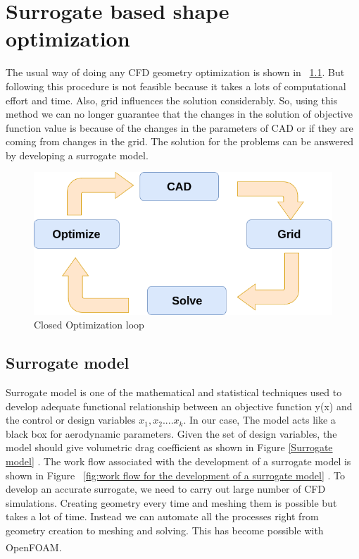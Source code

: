 \chapter{Surrogate based shape optimization}
\label{optimization}
The usual way of doing any CFD geometry optimization is shown in ~\ref{Closed Optimization loop}. But following this procedure is not feasible because it takes a lots of computational effort and time. Also, grid influences the solution considerably. So, using this method we can no longer guarantee that the changes in the solution of objective function value is because of the changes in the parameters of CAD or if they are coming from changes in the grid. The solution for the problems can be answered by developing a surrogate model.
\begin{figure}[htbp]
	\includegraphics[width=\textwidth]{optimization/closed_loop.png}
	\caption{Closed Optimization loop}
	\label{Closed Optimization loop} %
\end{figure}

\section{Surrogate model}

 Surrogate model is one of the mathematical and statistical techniques used to develop adequate functional relationship between an objective function y(x) and the control or design variables $ x_1 , x_2 .... x_k $. In our case, The model acts like a black box for aerodynamic parameters. Given the set of design variables, the model should give volumetric drag coefficient as shown in Figure \ref{Surrogate model} . The work flow associated with the development of a surrogate model is shown in Figure ~\ref{fig:work flow for the development of a surrogate model} . To develop an accurate surrogate, we need to carry out large number of CFD simulations. Creating geometry every time and meshing them is possible but takes a lot of time. Instead we can automate all the processes right from geometry creation to meshing and solving. This has become possible with OpenFOAM\textsuperscript{\textregistered}.

